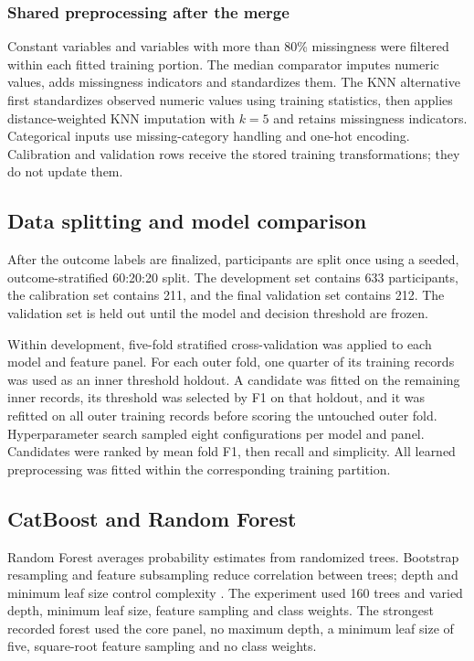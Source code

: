 \documentclass[11pt,a4paper]{article}
\begin{document}
\subsubsection*{Shared preprocessing after the merge}
Constant variables and variables with more than 80\% missingness were filtered within each fitted training portion. The median comparator imputes numeric values, adds missingness indicators and standardizes them. The KNN alternative first standardizes observed numeric values using training statistics, then applies distance-weighted KNN imputation with $k=5$ and retains missingness indicators. Categorical inputs use missing-category handling and one-hot encoding. Calibration and validation rows receive the stored training transformations; they do not update them.
\subsection{Data splitting and model comparison}
After the outcome labels are finalized, participants are split once using a seeded, outcome-stratified 60:20:20 split. The development set contains 633 participants, the calibration set contains 211, and the final validation set contains 212. The validation set is held out until the model and decision threshold are frozen.

Within development, five-fold stratified cross-validation was applied to each model and feature panel. For each outer fold, one quarter of its training records was used as an inner threshold holdout. A candidate was fitted on the remaining inner records, its threshold was selected by F1 on that holdout, and it was refitted on all outer training records before scoring the untouched outer fold. Hyperparameter search sampled eight configurations per model and panel. Candidates were ranked by mean fold F1, then recall and simplicity. All learned preprocessing was fitted within the corresponding training partition.

\subsection{CatBoost and Random Forest}
Random Forest averages probability estimates from randomized trees. Bootstrap resampling and feature subsampling reduce correlation between trees; depth and minimum leaf size control complexity \cite{forest}. The experiment used 160 trees and varied depth, minimum leaf size, feature sampling and class weights. The strongest recorded forest used the core panel, no maximum depth, a minimum leaf size of five, square-root feature sampling and no class weights.
\end{document}
